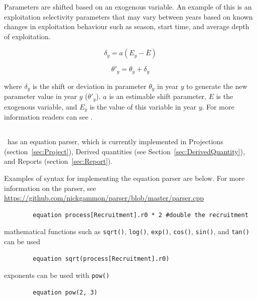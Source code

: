 Parameters are shifted based on an exogenous variable. An example of this is an exploitation selectivity parameters that may vary between years based on known changes in exploitation behaviour such as season, start time, and average depth of exploitation.

\begin{equation}
\delta_y = a(E_y - \bar{E})
\end{equation}

\begin{equation}
\theta'_y = \theta_y + \delta_y
\end{equation}

where $\delta_y$ is the shift or deviation in parameter $\theta_y$ in year $y$ to generate the new parameter value in year $y$ ($\theta'_y$). $a$ is an estimable shift parameter, $E$ is the exogenous variable, and $E_y$ is the value of this variable in year $y$. For more information readers can see \cite{francis_03}.

\subsection{\label{sec:eq_parser}} 

\CNAME\ has an equation parser, which is currently implemented in Projections (section~\ref{sec:Project}), Derived quantities (see Section~\ref{sec:DerivedQuantity}), and Reports (section~\ref{sec:Report}).

Examples of syntax for implementing the equation parser are below. For more information on the parser, see \url{https://github.com/nickgammon/parser/blob/master/parser.cpp}


{\small{\begin{verbatim}
		equation process[Recruitment].r0 * 2 #double the recruitment
\end{verbatim}}}

mathematical functions such as \texttt{sqrt()}, \texttt{log()},  \texttt{exp()},  \texttt{cos()}, \texttt{sin()}, and \texttt{tan()} can be used

{\small{\begin{verbatim}
		equation sqrt(process[Recruitment].r0)
\end{verbatim}}}

exponents can be used with \texttt{pow()}

{\small{\begin{verbatim}
		equation pow(2, 3)
\end{verbatim}}}

